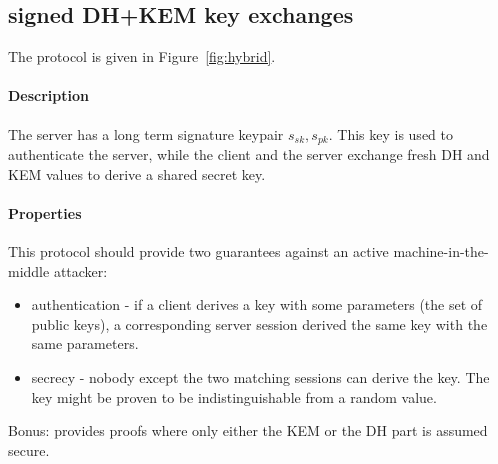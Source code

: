 \documentclass{article}
\newcommand{\sfsk}{\mathit{sk}}
\newcommand{\sfpk}{\mathit{pk}}
\begin{document}
\subsection{signed DH+KEM key exchanges}

The protocol is given in Figure~\ref{fig:hybrid}.

 \paragraph{Description} The server has a long term signature keypair $s_\sfsk,s_\sfpk$. 
This key is used to authenticate the server, while the client and the server exchange fresh DH and KEM values to derive a shared secret key.

\paragraph{Properties} This protocol should provide two guarantees against an active machine-in-the-middle attacker:
\begin{itemize}
\item authentication - if a client derives a key with some parameters (the set of public keys), a corresponding server session derived the same key with the same parameters.
\item secrecy - nobody except the two matching sessions can derive the key.  The key might be proven to be indistinguishable from a random value.
\end{itemize}

Bonus: provides proofs where only either the KEM or the DH part is assumed secure.
\end{document}

